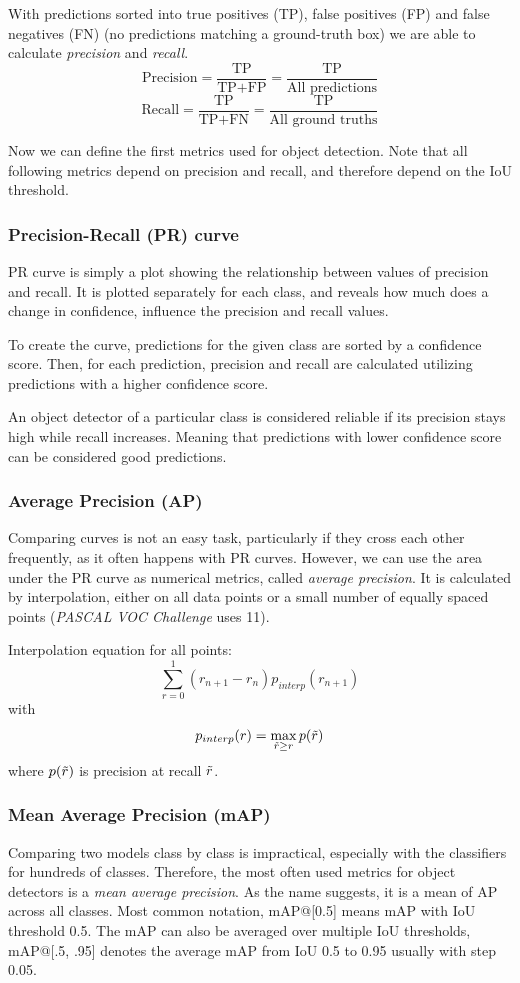 With predictions sorted into true positives (TP), false positives (FP) and false negatives (FN) (no predictions matching a ground-truth box) we are able to calculate \textit{precision} and \textit{recall}.
$$\text{Precision} = \frac{\text{TP}}{\text{TP}+\text{FP}} = \frac{\text{TP}}{\text{All predictions}}$$
$$\text{Recall} = \frac{\text{TP}}{\text{TP}+\text{FN}} = \frac{\text{TP}}{\text{All ground truths}}$$

Now we can define the first metrics used for object detection. Note that all following metrics depend on precision and recall, and therefore depend on the IoU threshold.

\subsubsection{Precision-Recall (PR) curve}
PR curve is simply a plot showing the relationship between values of precision and recall. It is plotted separately for each class, and reveals how much does a change in confidence, influence the precision and recall values. 

To create the curve, predictions for the given class are sorted by a confidence score. Then, for each prediction, precision and recall are calculated utilizing predictions with a higher confidence score. 

An object detector of a particular class is considered reliable if its precision stays high while recall increases. Meaning that predictions with lower confidence score can be considered good predictions.

\subsubsection{Average Precision (AP)}
Comparing curves is not an easy task, particularly if they cross each other frequently, as it often happens with PR curves. However, we can use the area under the PR curve as numerical metrics, called \textit{average precision}. It is calculated by interpolation, either on all data points or a small number of equally spaced points (\textit{PASCAL VOC Challenge} uses 11).

Interpolation equation for all points:
$$\sum_{r=0}^1 (r_{n+1} - r_n ) p_{interp}(r_{n+1})$$
with
$$p_{interp}(r) = \max_{\Tilde{r} \geq r} p(\Tilde{r})$$
where $p(\Tilde{r})$ is precision at recall $\Tilde{r}$.

\subsubsection{Mean Average Precision (mAP)}
Comparing two models class by class is impractical, especially with the classifiers for hundreds of classes. Therefore, the most often used metrics for object detectors is a \textit{mean average precision}. As the name suggests, it is a mean of AP across all classes. Most common notation, mAP@[0.5] means mAP with IoU threshold 0.5. The mAP can also be averaged over multiple IoU thresholds, mAP@[.5, .95] denotes the average mAP from IoU 0.5 to 0.95 usually with step 0.05.

